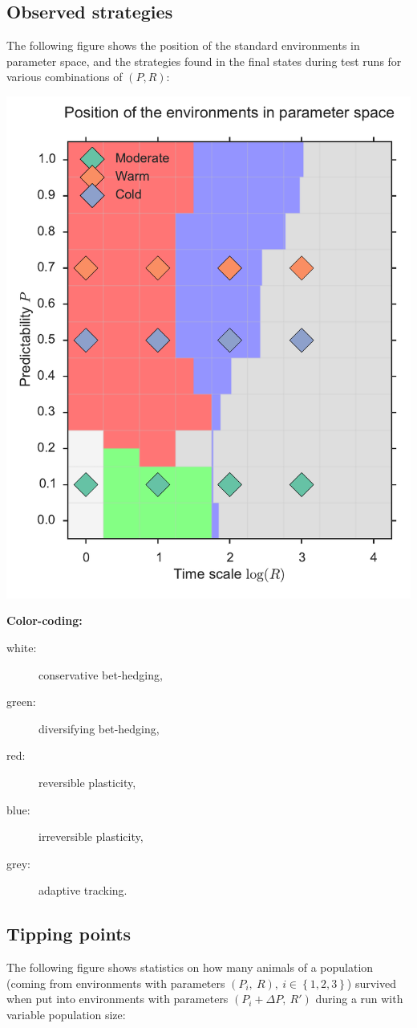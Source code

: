 \documentclass[
12pt, %
a4paper, %
headinclude,footinclude %
]{article}
\begin{document}
\subsection{Observed strategies}
The following figure shows the position of the standard environments in parameter space, and the strategies found in the final states during test runs for various combinations of $(P,R)$:

\centerline{\includegraphics[width=.8\linewidth]{paraspace_axis}}

\noindent\textbf{Color-coding:}
\begin{description}
	\item[white:] conservative bet-hedging,
	\item[green:] diversifying bet-hedging,
	\item[red:] reversible plasticity,
	\item[blue:] irreversible plasticity,
	\item[grey:] adaptive tracking.
\end{description}

\subsection{Tipping points}
The following figure shows statistics on how many animals of a population (coming from environments with parameters $(P_i,~R), ~i\in\left\{1,2,3\right\}$) survived when put into environments with parameters $(P_i + \Delta P,~R')$ during a run with variable population size:
  
\end{document}
